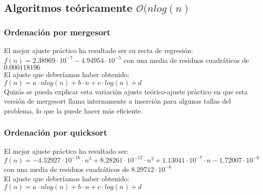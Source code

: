 \documentclass[a4paper, 11pt]{article} %
\begin{document}
\subsection{Algoritmos teóricamente $\mathcal{O}(nlog(n)$}
  \subsubsection{Ordenación por mergesort}
  El mejor ajuste práctico ha resultado ser su recta de regresión: $f(n)=2.38969\cdot 10^{-7} -4.94954\cdot 10 ^{-5}$
  con una media de residuos cuadráticos de $0.000118196$\\
  El ajuste que deberíamos haber obtenido: $f(n)=a \cdot nlog(n) + b\cdot n+c \cdot log(n) + d$\\

  Quizás se pueda explicar esta variación ajuste teórico-ajuste práctico en que esta versión de mergesort llama internamente
  a inserción para algunas tallas del problema, lo que la puede hacer más eficiente.\\
  
    
    \noindent{}
    
    
  \subsubsection{Ordenación por quicksort}
  El mejor ajuste práctico ha resultado ser: $f(n)=-4.52927\cdot 10^{-16} \cdot n^3+8.28261\cdot 10^{-12}\cdot n^2+1.13041 \cdot 10^{-7}\cdot n-
  1.72007\cdot 10^{-6}$ con una media de residuos cuadráticos de $8.29712\cdot 10^{-6}$\\
  El ajuste que deberíamos haber obtenido: $f(n)=a \cdot nlog(n) + b\cdot n+c \cdot log(n) + d$\\
  
\end{document}
